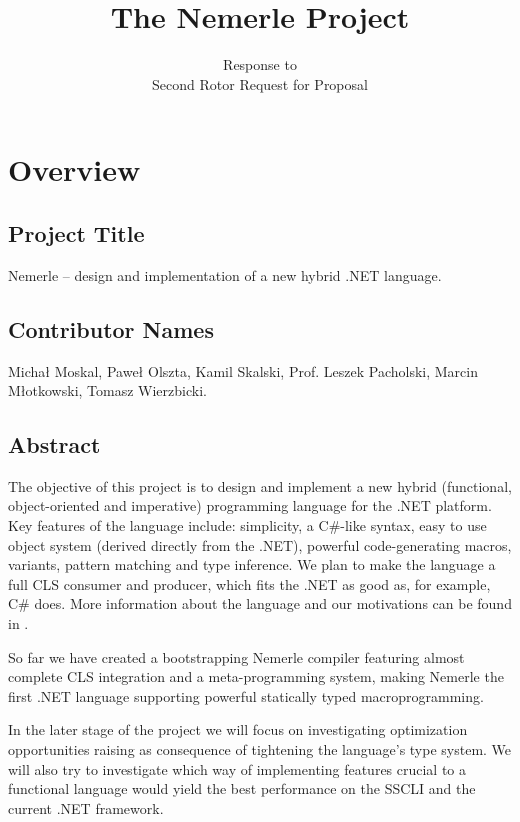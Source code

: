 \documentclass[a4paper,11pt]{article}
\title{The Nemerle Project}
\author{Response to\\Second Rotor Request for Proposal}
\date{}
\begin{document}
\maketitle
\thispagestyle{empty}

\section{Overview}

\subsection{Project Title}

Nemerle -- design and implementation of a new hybrid .NET language.

\subsection{Contributor Names}
Micha{\l} Moskal, Pawe{\l} Olszta, Kamil Skalski, Prof. Leszek Pacholski, Marcin M{\l}otkowski,
Tomasz Wierzbicki.

\subsection{Abstract}

The objective of this project is to design and implement a new 
hybrid (functional, object-oriented and imperative) programming 
language for the .NET platform. Key features of the language 
include: simplicity, a C\#-like syntax, easy to use object 
system (derived directly from the .NET), powerful code-generating 
macros, variants, pattern matching and type inference. We plan 
to make the language a full CLS consumer and producer, which 
fits the .NET as good as, for example, C\# does. More information
about the language and our motivations can be found in \cite{Intro}.

So far we have created a bootstrapping Nemerle compiler featuring
almost complete CLS integration and a meta-programming system,
making Nemerle the first .NET language supporting powerful 
statically typed macroprogramming.

In the later stage of the project we will focus on investigating 
optimization opportunities raising as consequence of tightening 
the language's type system. We will also try to investigate 
which way of implementing features crucial to a functional 
language would yield the best performance on the SSCLI and 
the current .NET framework.
\end{document}
